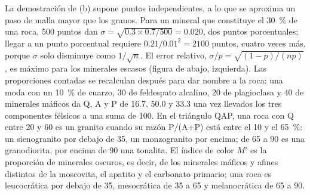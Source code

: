 La demostración de (b) supone puntos independientes, a lo que se aproxima un paso de malla mayor que los granos.
Para un mineral que constituye el \qty{30}{\percent} de una roca, 500 puntos dan $\sigma =
\sqrt{0.3 \times 0.7/500} = 0.020$, dos puntos porcentuales; llegar a un punto porcentual requiere
$0.21/0.01^2 = 2100$ puntos, cuatro veces más, porque $\sigma$ solo disminuye como $1/\sqrt n$. El
error relativo, $\sigma/p = \sqrt{(1-p)/(np)}$, es máximo para los minerales escasos (figura de abajo,
izquierda). Las proporciones contadas se recalculan después para dar nombre a la roca: una moda con un
\qty{10}{\percent} de cuarzo, 30 de feldespato alcalino, 20 de plagioclasa y 40 de minerales máficos da Q, A y
P de 16.7, 50.0 y 33.3 una vez llevados los tres componentes félsicos a una suma de 100. En el triángulo
QAP, una roca con Q entre 20 y 60 es un granito cuando su razón P/(A+P) está entre el 10 y el
\qty{65}{\percent}: un sienogranito por debajo de 35, un monzogranito por encima; de 65 a 90 es una
granodiorita, por encima de 90 una tonalita. El índice de color $M'$ es la proporción de minerales oscuros, es
decir, de los minerales máficos y afines distintos de la moscovita, el apatito y el carbonato primario; una roca es
leucocrática por debajo de 35, mesocrática de 35 a 65 y melanocrática de 65 a 90.

